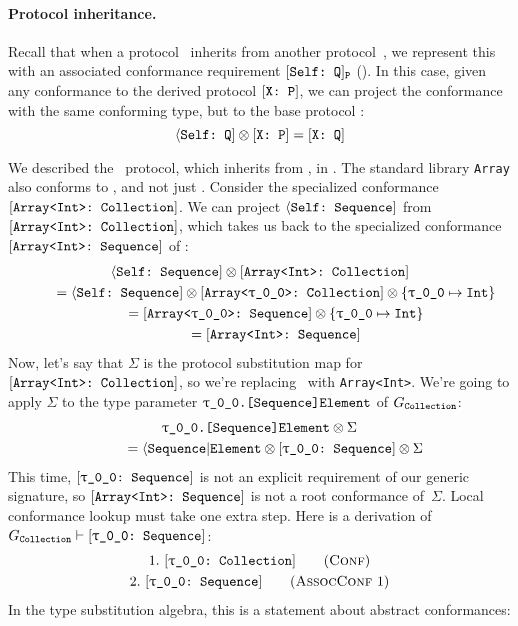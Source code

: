 \documentclass[../generics]{subfiles}
\begin{document}
\paragraph{Protocol inheritance.}
Recall that when a protocol \tP\ inherits from another protocol~\tQ, we represent this with an associated conformance requirement $[\texttt{Self:~Q}]_{\texttt{P}}$ (). In this case, given any conformance to the derived protocol $[\texttt{X:~P}]$, we can project the conformance with the same conforming type, but to the base protocol \tQ:
\[
\langle\texttt{Self:~Q}] \otimes [\texttt{X:~P}] = [\texttt{X:~Q}]
\]

\begin{example}\label{protocol inherit assoc conf}
We described the \tCollection\ protocol, which inherits from \tSequence, in . The standard library \texttt{Array} also conforms to \tCollection, and not just \tSequence. Consider the specialized conformance $[\texttt{Array<Int>:~Collection}]$. We can project $\langle\texttt{Self:~Sequence}]$ from $[\texttt{Array<Int>:~Collection}]$, which takes us back to the specialized conformance $[\texttt{Array<Int>:~Sequence}]$ of :
\begin{gather*}
\SelfSequence \otimes \ArrayIntCollection \\
\qquad {} = \SelfSequence \otimes \ArrayCollection \otimes \SubMapInt\\
\qquad {} = \ArraySequence \otimes \SubMapInt\\
\qquad {} = \ArrayIntSequence
\end{gather*}
Now, let's say that $\Sigma$ is the protocol substitution map for $[\texttt{Array<Int>:~Collection}]$, so we're replacing \rT\ with \texttt{Array<Int>}. We're going to apply $\Sigma$ to the type parameter $\texttt{\rT.[Sequence]Element}$ of $G_{\texttt{Collection}}$:
\begin{gather*}
\texttt{\rT.[Sequence]Element} \otimes \Sigma \\
\qquad {} = \AElement \otimes \rTSequence \otimes \Sigma
\end{gather*}
This time, $\rTSequence$ is not an explicit requirement of our generic signature, so $[\texttt{Array<Int>:~Sequence}]$ is not a root conformance of~$\Sigma$. Local conformance lookup must take one extra step. Here is a derivation of $G_\tCollection\vdash\rTSequence$:
\begin{gather*}
\ConfStep{\rT}{Collection}{1}\\
\AssocConfStep{1}{\rT}{Sequence}{2}
\end{gather*}
In the type substitution algebra, this is a statement about abstract conformances:

\end{example}
\end{document}
